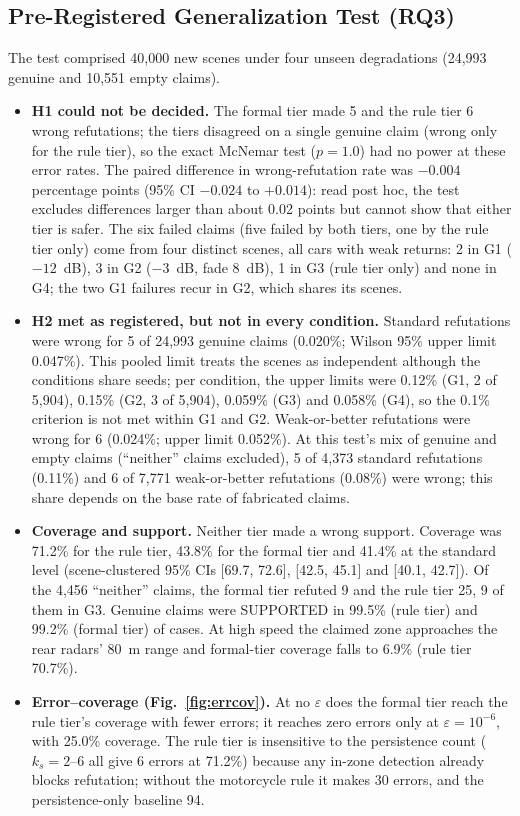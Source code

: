\subsection{Pre-Registered Generalization Test (RQ3)}\label{sec:prereg}
The test comprised 40,000 new scenes under four unseen degradations (24,993 genuine and 10,551 empty claims).
\begin{itemize}
\item \textbf{H1 could not be decided.} The formal tier made 5 and the rule tier 6 wrong refutations; the tiers disagreed on a single genuine claim (wrong only for the rule tier), so the exact McNemar test ($p = 1.0$) had no power at these error rates. The paired difference in wrong-refutation rate was $-0.004$ percentage points (95\% CI $-0.024$ to $+0.014$): read post hoc, the test excludes differences larger than about 0.02 points but cannot show that either tier is safer. The six failed claims (five failed by both tiers, one by the rule tier only) come from four distinct scenes, all cars with weak returns: 2 in G1 ($-12$~dB), 3 in G2 ($-3$~dB, fade 8~dB), 1 in G3 (rule tier only) and none in G4; the two G1 failures recur in G2, which shares its scenes.
\item \textbf{H2 met as registered, but not in every condition.} Standard refutations were wrong for 5 of 24,993 genuine claims (0.020\%; Wilson 95\% upper limit 0.047\%). This pooled limit treats the scenes as independent although the conditions share seeds; per condition, the upper limits were 0.12\% (G1, 2 of 5,904), 0.15\% (G2, 3 of 5,904), 0.059\% (G3) and 0.058\% (G4), so the 0.1\% criterion is not met within G1 and G2. Weak-or-better refutations were wrong for 6 (0.024\%; upper limit 0.052\%). At this test's mix of genuine and empty claims (``neither'' claims excluded), 5 of 4,373 standard refutations (0.11\%) and 6 of 7,771 weak-or-better refutations (0.08\%) were wrong; this share depends on the base rate of fabricated claims.
\item \textbf{Coverage and support.} Neither tier made a wrong support. Coverage was 71.2\% for the rule tier, 43.8\% for the formal tier and 41.4\% at the standard level (scene-clustered 95\% CIs [69.7, 72.6], [42.5, 45.1] and [40.1, 42.7]). Of the 4,456 ``neither'' claims, the formal tier refuted 9 and the rule tier 25, 9 of them in G3. Genuine claims were SUPPORTED in 99.5\% (rule tier) and 99.2\% (formal tier) of cases. At high speed the claimed zone approaches the rear radars' 80~m range and formal-tier coverage falls to 6.9\% (rule tier 70.7\%).
\item \textbf{Error--coverage (Fig.~\ref{fig:errcov}).} At no $\varepsilon$ does the formal tier reach the rule tier's coverage with fewer errors; it reaches zero errors only at $\varepsilon = 10^{-6}$, with 25.0\% coverage. The rule tier is insensitive to the persistence count ($k_s = 2$--6 all give 6 errors at 71.2\%) because any in-zone detection already blocks refutation; without the motorcycle rule it makes 30 errors, and the persistence-only baseline 94.

\end{itemize}
